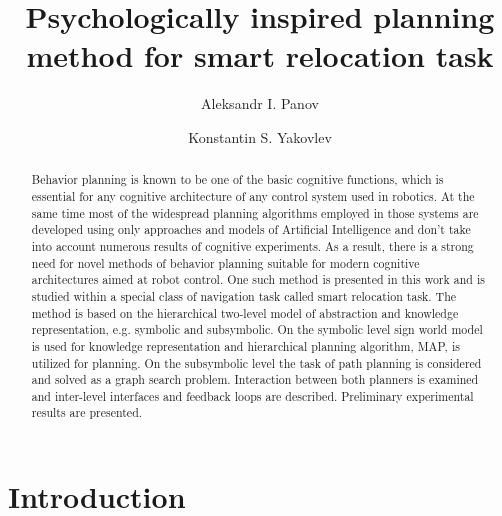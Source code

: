 \documentclass[procedia]{easychair}
\title{Psychologically inspired planning method for smart relocation task}
\author{
    Aleksandr I. Panov
\and
    Konstantin S. Yakovlev
}
\institute{
  Federal Research Center ``Computer Science and Control'' of Russian Academy of Sciences,
  Moscow, Russia\\
  \email{\{pan,yakovlev\}@isa.ru}
 }
\begin{document}
\maketitle


\begin{abstract}
  Behavior planning is known to be one of the basic cognitive functions, which is essential for any cognitive architecture of any control system used in robotics. At the same time most of the widespread planning algorithms employed in those systems are developed using only approaches and models of Artificial Intelligence and don't take into account numerous results of cognitive experiments. As a result, there is a strong need for novel methods of behavior planning suitable for modern cognitive architectures aimed at robot control. One such method is presented in this work and is studied within a special class of navigation task called smart relocation task. The method is based on the hierarchical two-level model of abstraction and knowledge representation, e.g. symbolic and subsymbolic. On the symbolic level sign world model is used for knowledge representation and hierarchical planning algorithm, MAP, is utilized for planning. On the subsymbolic level the task of path planning is considered and solved as a graph search problem. Interaction between both planners is examined and inter-level interfaces and feedback loops are described. Preliminary experimental results are presented.
\end{abstract}


%
%


\section{Introduction}
\label{sect:introduction}
\end{document}
